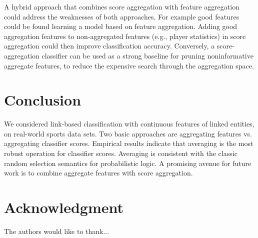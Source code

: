 \documentclass[conference]{IEEEtran}
\begin{document}


A hybrid approach that combines score aggregation with feature aggregation could address the weaknesses of both approaches.
For example good features could be found learning a model based on feature aggregation. Adding  good aggregation features to non-aggregated features (e.g., player statistics) in score aggregation could then improve classification accuracy. Conversely, a score-aggregation classifier can be used as a strong baseline for pruning noninformative aggregate features, to reduce the expensive search through the aggregation space.


\section{Conclusion}
We considered link-based classification with continuous features of linked entities, on real-world sports data sets. Two basic approaches are aggregating features vs. aggregating classifier scores. Empirical results indicate that averaging is the most robust operation for classifier scores. Averaging is consistent with the classic random selection semantics for probabilistic logic. A promising avenue for future work is to combine aggregate features with score aggregation.






\section*{Acknowledgment}


The authors would like to thank...





\end{document}
